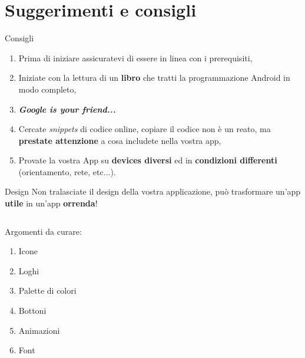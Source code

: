 \documentclass[xcolor=svgnames,11pt]{beamer}
\begin{document}
\section{Suggerimenti e consigli}

\begin{frame}{Consigli}
\pause
\begin{enumerate}
\item Prima di iniziare assicuratevi di essere in linea con i prerequisiti,
\pause
\item Iniziate con la lettura di un \textbf{libro} che tratti la programmazione Android in modo completo,
\pause
\item \textbf{\emph{Google is your friend...}}
\pause
\item Cercate \textit{snippets} di codice online, copiare il codice non \`e un reato, ma \textbf{prestate attenzione} a cosa includete nella vostra app,
\pause
\item Provate la vostra App su \textbf{devices diversi} ed in \textbf{condizioni differenti} (orientamento, rete, etc...).
\end{enumerate}
\end{frame}

\begin{frame}[fragile]{Design}
Non tralasciate il design della vostra applicazione, pu\`o trasformare un'app \textbf{utile} in un'app \textbf{orrenda}!

\pause
\medskip


\begin{columns}
    \begin{column}{0.3\textwidth}
Argomenti da curare:
\pause
\begin{enumerate}
\item Icone
\pause
\item Loghi
\pause
\item Palette di colori
\pause
\item Bottoni
\pause
\item Animazioni
\pause
\item Font
\end{enumerate}
\end{column}

\begin{column}{0.7\textwidth}
\begin{center}
\end{center}
\end{column}
\end{columns}
\end{frame}
\end{document}
